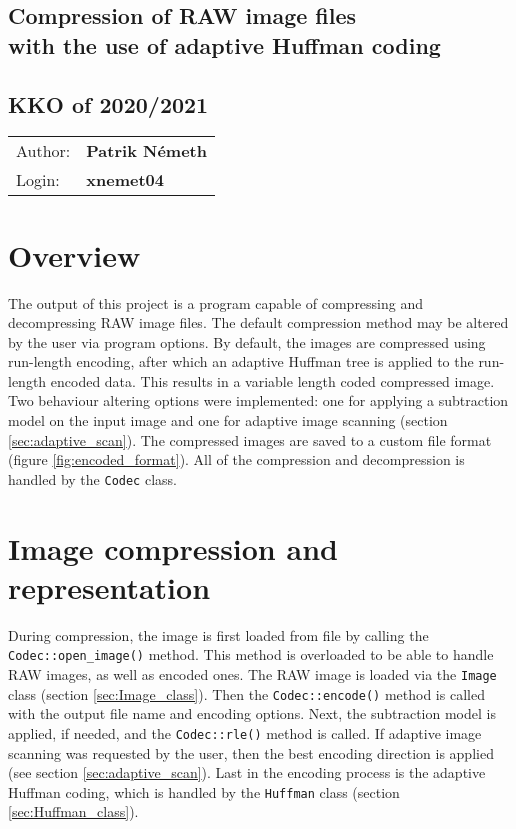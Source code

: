 \documentclass[pdftex, 11pt, a4paper, titlepage]{article}
\newcommand{\code}{\texttt}
\begin{document}
    \begin{center}
        \section*{Compression of RAW image files\\with the use of adaptive Huffman coding}
        \subsection*{KKO of 2020/2021}
        \begin{tabular}{ l l }
            Author: & \textbf{Patrik Németh} \\
            Login: & \textbf{xnemet04}
        \end{tabular}
    \end{center}

    \section{Overview}
    The output of this project is a program capable of compressing and decompressing RAW image files.
    The default compression method may be altered by the user via program options. By default, the
    images are compressed using run-length encoding, after which an adaptive Huffman tree is applied
    to the run-length encoded data. This results in a variable length coded compressed image.
    Two behaviour altering options were implemented: one for applying a subtraction model on the input
    image and one for adaptive image scanning (section \ref{sec:adaptive_scan}).
    The compressed images are saved to a custom file format (figure \ref{fig:encoded_format}).
    All of the compression and decompression is handled by the \code{Codec} class.

    \section{Image compression and representation} \label{sec:compression}
    During compression, the image is first loaded from file by calling the \code{Codec::open\_image()} method.
    This method is overloaded to be able to handle RAW images, as well as encoded ones. The RAW image
    is loaded via the \code{Image} class (section \ref{sec:Image_class}). Then the \code{Codec::encode()}
    method is called with the output file name and encoding options. Next, the subtraction model is applied,
    if needed, and the \code{Codec::rle()} method is called. If adaptive image scanning was requested by the user,
    then the best encoding direction is applied (see section \ref{sec:adaptive_scan}). Last in the
    encoding process is the adaptive Huffman coding, which is handled by the \code{Huffman} class
    (section \ref{sec:Huffman_class}).
\end{document}
